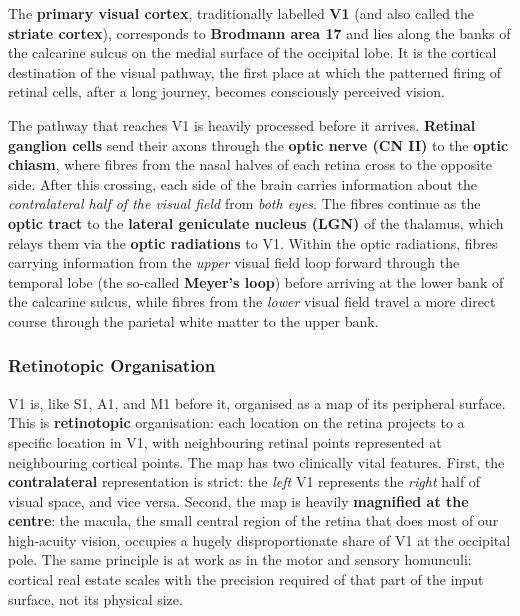 \documentclass[11pt]{article}
\begin{document}
The \textbf{primary visual cortex}, traditionally labelled \textbf{V1} (and also called the \textbf{striate cortex}), corresponds to \textbf{Brodmann area 17} and lies along the banks of the calcarine sulcus on the medial surface of the occipital lobe. It is the cortical destination of the visual pathway, the first place at which the patterned firing of retinal cells, after a long journey, becomes consciously perceived vision.

The pathway that reaches V1 is heavily processed before it arrives. \textbf{Retinal ganglion cells} send their axons through the \textbf{optic nerve (CN II)} to the \textbf{optic chiasm}, where fibres from the nasal halves of each retina cross to the opposite side. After this crossing, each side of the brain carries information about the \textit{contralateral half of the visual field} from \textit{both eyes}. The fibres continue as the \textbf{optic tract} to the \textbf{lateral geniculate nucleus (LGN)} of the thalamus, which relays them via the \textbf{optic radiations} to V1. Within the optic radiations, fibres carrying information from the \textit{upper} visual field loop forward through the temporal lobe (the so-called \textbf{Meyer's loop}) before arriving at the lower bank of the calcarine sulcus, while fibres from the \textit{lower} visual field travel a more direct course through the parietal white matter to the upper bank.

\subsubsection{Retinotopic Organisation}

V1 is, like S1, A1, and M1 before it, organised as a map of its peripheral surface. This is \textbf{retinotopic} organisation: each location on the retina projects to a specific location in V1, with neighbouring retinal points represented at neighbouring cortical points. The map has two clinically vital features. First, the \textbf{contralateral} representation is strict: the \textit{left} V1 represents the \textit{right} half of visual space, and vice versa. Second, the map is heavily \textbf{magnified at the centre}: the macula, the small central region of the retina that does most of our high-acuity vision, occupies a hugely disproportionate share of V1 at the occipital pole. The same principle is at work as in the motor and sensory homunculi: cortical real estate scales with the precision required of that part of the input surface, not its physical size.
\end{document}
